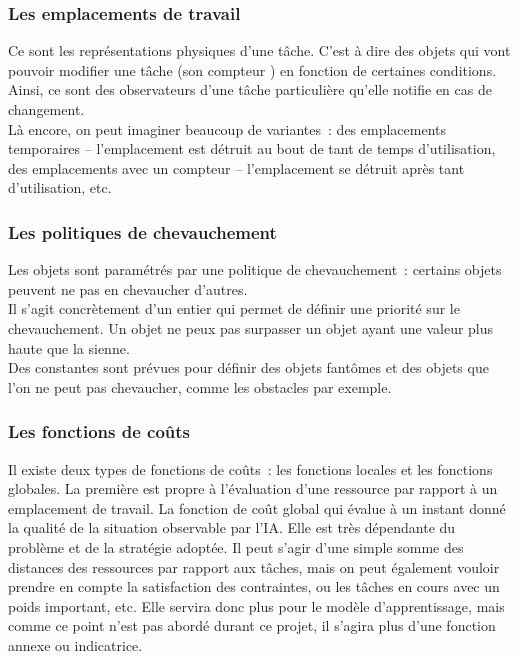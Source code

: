 \subsubsection*{Les emplacements de travail}

Ce sont les représentations physiques d'une tâche. C'est à dire des objets qui vont pouvoir modifier une tâche (son \og compteur \fg ) en fonction de certaines conditions.\\
Ainsi, ce sont des observateurs d'une tâche particulière qu'elle notifie en cas de changement.\\

Là encore, on peut imaginer beaucoup de variantes~: des emplacements temporaires – l'emplacement est détruit au bout de tant de temps d'utilisation, des emplacements avec un compteur – l'emplacement se détruit après tant d'utilisation, etc.

\subsubsection*{Les politiques de chevauchement}

Les objets sont paramétrés par une politique de chevauchement~: certains objets peuvent ne pas en chevaucher d'autres.\\
Il s'agit concrètement d'un entier qui permet de définir une priorité sur le chevauchement. Un objet ne peux pas surpasser un objet ayant une valeur plus haute que la sienne.\\
Des constantes sont prévues pour définir des objets \og fantômes \fg et des objets que l'on ne peut pas chevaucher, comme les obstacles par exemple.

\subsubsection*{Les fonctions de coûts}

Il existe deux types de fonctions de coûts~: les fonctions locales et les fonctions globales. La première est propre à l'évaluation d'une ressource par rapport à un emplacement de travail.
La fonction de coût global qui évalue à un instant donné la qualité de la situation observable par l'IA. Elle est très dépendante du problème et de la stratégie adoptée. Il peut s'agir d'une simple somme des distances des ressources par rapport aux tâches, mais on peut également vouloir prendre en compte la satisfaction des contraintes, ou les tâches en cours avec un poids important, etc.
Elle servira donc plus pour le modèle d'apprentissage, mais comme ce point n'est pas abordé durant ce projet, il s'agira plus d'une fonction annexe ou indicatrice.\\


